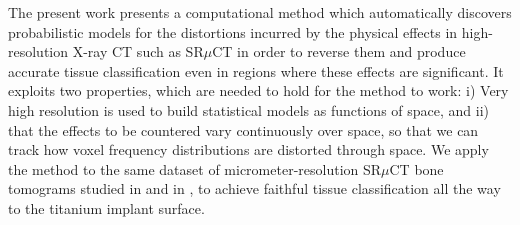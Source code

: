 The present work presents a computational method which automatically discovers probabilistic
models for the distortions incurred by the physical effects in high-resolution X-ray CT such
as SR$\mu$CT in order to reverse them and produce accurate tissue classification even in regions
where these effects are significant. It exploits two properties, which are needed to hold for
the method to work: i) Very high resolution is used to build statistical models as functions
of space, and ii) that the effects to be countered vary continuously over space, so that we can
track how voxel frequency distributions are distorted through space. We apply the method to the
same dataset of micrometer-resolution SR$\mu$CT bone tomograms studied in \cite{torsten2018}
and in \cite{sporring}, to achieve faithful tissue classification all the way to the titanium
implant surface.


